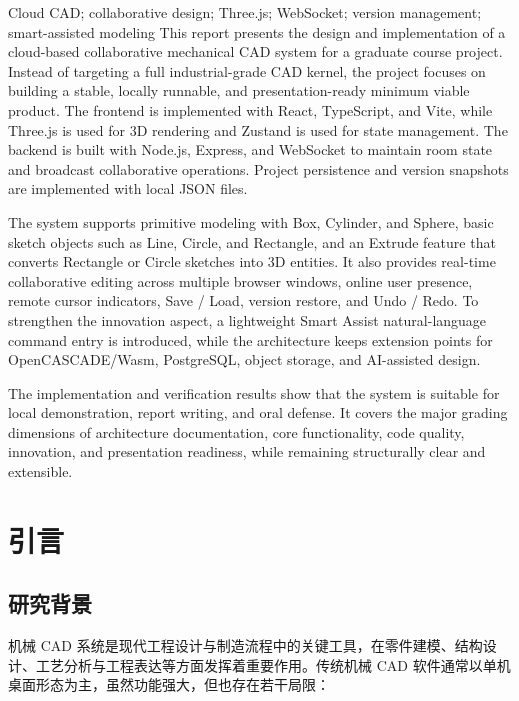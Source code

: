 \documentclass[supercite,macfont]{HustGSClassPaper}
\begin{document}
\begin{enabstract}{Cloud CAD; collaborative design; Three.js; WebSocket; version management; smart-assisted modeling}
This report presents the design and implementation of a cloud-based collaborative mechanical CAD system for a graduate course project. Instead of targeting a full industrial-grade CAD kernel, the project focuses on building a stable, locally runnable, and presentation-ready minimum viable product. The frontend is implemented with React, TypeScript, and Vite, while Three.js is used for 3D rendering and Zustand is used for state management. The backend is built with Node.js, Express, and WebSocket to maintain room state and broadcast collaborative operations. Project persistence and version snapshots are implemented with local JSON files.

The system supports primitive modeling with Box, Cylinder, and Sphere, basic sketch objects such as Line, Circle, and Rectangle, and an Extrude feature that converts Rectangle or Circle sketches into 3D entities. It also provides real-time collaborative editing across multiple browser windows, online user presence, remote cursor indicators, Save / Load, version restore, and Undo / Redo. To strengthen the innovation aspect, a lightweight Smart Assist natural-language command entry is introduced, while the architecture keeps extension points for OpenCASCADE/Wasm, PostgreSQL, object storage, and AI-assisted design.

The implementation and verification results show that the system is suitable for local demonstration, report writing, and oral defense. It covers the major grading dimensions of architecture documentation, core functionality, code quality, innovation, and presentation readiness, while remaining structurally clear and extensible.
\end{enabstract}

\tableofcontents[pagenum=true]

\clearpage
{}

\section{引言}

\subsection{研究背景}

机械 CAD 系统是现代工程设计与制造流程中的关键工具，在零件建模、结构设计、工艺分析与工程表达等方面发挥着重要作用。传统机械 CAD 软件通常以单机桌面形态为主，虽然功能强大，但也存在若干局限：
\end{document}
